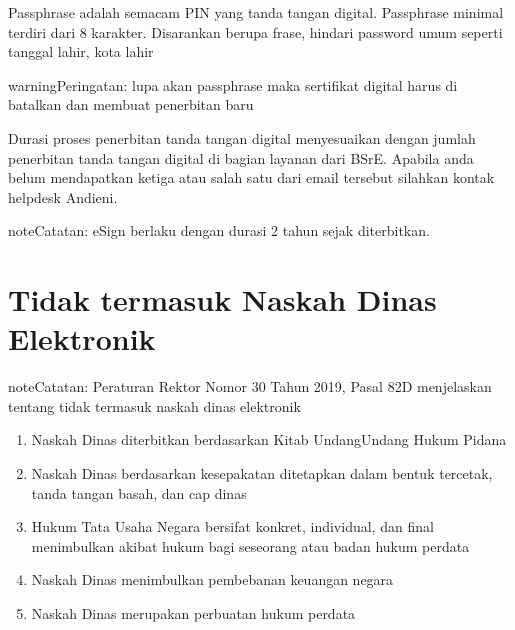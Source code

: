 \documentclass[letterpaper,10pt,bahasai]{sphinxmanual}
\begin{document}
Passphrase adalah semacam PIN yang  tanda tangan digital. Passphrase minimal
terdiri dari 8 karakter. Disarankan berupa frase, hindari password umum seperti tanggal lahir, kota lahir

\begin{sphinxadmonition}{warning}{Peringatan:}
lupa akan passphrase maka sertifikat digital harus di batalkan dan membuat penerbitan baru
\end{sphinxadmonition}

Durasi proses penerbitan tanda tangan digital menyesuaikan dengan jumlah penerbitan tanda tangan digital di bagian
layanan dari BSrE. Apabila anda belum mendapatkan ketiga atau salah satu dari email tersebut silahkan kontak helpdesk
Andieni.

\begin{sphinxadmonition}{note}{Catatan:}
eSign berlaku dengan durasi 2 tahun sejak diterbitkan.
\end{sphinxadmonition}


\section{Tidak termasuk Naskah Dinas Elektronik}
\label{\detokenize{daftar_eSign:tidak-termasuk-naskah-dinas-elektronik}}
\begin{sphinxadmonition}{note}{Catatan:}
Peraturan Rektor Nomor 30 Tahun 2019, Pasal 82D menjelaskan tentang tidak termasuk naskah dinas elektronik
\end{sphinxadmonition}
\begin{enumerate}
%
\item {} 
Naskah Dinas diterbitkan berdasarkan Kitab Undang\sphinxhyphen{}Undang Hukum Pidana

\item {} 
Naskah Dinas berdasarkan kesepakatan ditetapkan dalam bentuk tercetak, tanda tangan basah, dan cap dinas

\item {} 
Hukum Tata Usaha Negara bersifat konkret, individual, dan final menimbulkan akibat hukum bagi seseorang atau badan hukum perdata

\item {} 
Naskah Dinas menimbulkan pembebanan keuangan negara

\item {} 
Naskah Dinas merupakan perbuatan hukum perdata

\end{enumerate}
\end{document}
